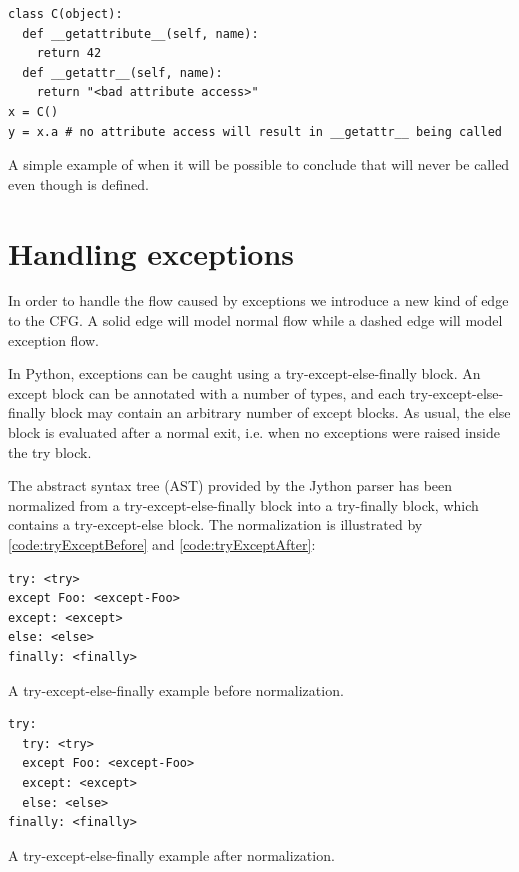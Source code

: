 \begin{listing}[H]
  \begin{verbatim}
class C(object):
  def __getattribute__(self, name):
    return 42
  def __getattr__(self, name):
    return "<bad attribute access>"
x = C()
y = x.a # no attribute access will result in __getattr__ being called
  \end{verbatim}
  \caption{A simple example of when it will be possible to conclude that  will never be called even though  is defined.}
  \label{code:MagicMethods2}
\end{listing}



\section{Handling exceptions}
\label{chapter:Exceptions}
In order to handle the flow caused by exceptions we introduce a new kind of edge to the CFG. A solid edge will model normal flow while a dashed edge will model exception flow. 

In Python, exceptions can be caught using a try-except-else-finally block. An except block can be annotated with a number of types, and each try-except-else-finally block may contain an arbitrary number of except blocks. As usual, the else block is evaluated after a normal exit, i.e. when no exceptions were raised inside the try block.

The abstract syntax tree (AST) provided by the Jython parser \cite{jython} has been normalized from a try-except-else-finally block into a try-finally block, which contains a try-except-else block. The normalization is illustrated by \autoref{code:tryExceptBefore} and \autoref{code:tryExceptAfter}:

\begin{listing}[H]
	\begin{verbatim}
try: <try>
except Foo: <except-Foo>
except: <except>
else: <else>
finally: <finally>
	\end{verbatim}
	\caption{A try-except-else-finally example before normalization.}
  \label{code:tryExceptBefore}
\end{listing}

\begin{listing}[H]
	\begin{verbatim}
try: 
  try: <try>
  except Foo: <except-Foo>
  except: <except>
  else: <else>
finally: <finally>
	\end{verbatim}
	\caption{A try-except-else-finally example after normalization.}
  \label{code:tryExceptAfter}
\end{listing}

